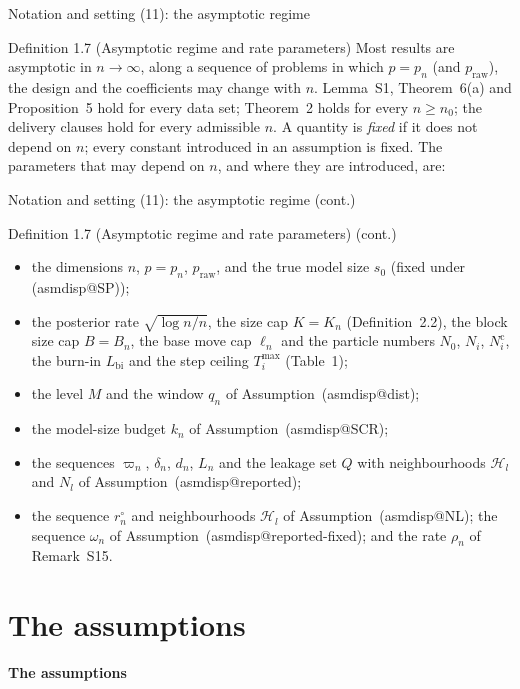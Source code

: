 \documentclass[aspectratio=169]{beamer}
\makeatletter
\newcommand{\asmdisp}[1]{\csname asmdisp@#1\endcsname}
\newcommand{\as}[1]{\textup{(\asmdisp{#1})}}
\newcommand{\praw}{p_{\mathrm{raw}}}
\newcommand{\sz}{s_0}
\newcommand{\rn}{\sqrt{\log n/n}}
\newcommand{\Hl}{\mathcal H}
\newcommand{\Nc}{N^{\mathrm c}}
\newcommand{\Lbi}{L_{\mathrm{bi}}}
\newcommand{\Tmax}{T^{\max}}
\makeatother
\begin{document}
\begin{frame}{Notation and setting (11): the asymptotic regime}
\footnotesize
\begin{block}{Definition 1.7 (Asymptotic regime and rate parameters)}
Most results are asymptotic in $n\to\infty$, along a sequence of problems in which $p=p_n$ (and $\praw$), the design and
the coefficients may change with $n$. Lemma~S1, Theorem~6(a) and Proposition~5 hold for every data
set; Theorem~2 holds for every $n\ge n_0$; the delivery clauses hold for every admissible $n$. A quantity is
\emph{fixed} if it does not depend on $n$; every constant introduced
in an assumption is fixed. The parameters that may depend on $n$, and where they are introduced, are:
\end{block}
\end{frame}

\begin{frame}{Notation and setting (11): the asymptotic regime (cont.)}
\footnotesize
\begin{block}{Definition 1.7 (Asymptotic regime and rate parameters) (cont.)}
\begin{itemize}
  \item the dimensions $n$, $p=p_n$, $\praw$, and the true model size $\sz$ (fixed under \as{SP});
  \item the posterior rate $\rn$, the size cap $K=K_n$ (Definition~2.2), the block size cap $B=B_n$, the
    base move cap $\ell_n$ and the particle numbers $N_0$, $N_i$, $\Nc_i$, the burn-in $\Lbi$ and the step ceiling
    $\Tmax_i$ (Table~1);
  \item the level $M$ and the window $q_n$ of Assumption~\as{dist};
  \item the model-size budget $k_n$ of Assumption~\as{SCR};
  \item the sequences $\varpi_n$, $\delta_n$, $d_n$, $L_n$ and the leakage set $Q$ with neighbourhoods $\Hl_l$ and
    $N_l$ of Assumption~\as{reported};
  \item the sequence $r^\circ_n$ and neighbourhoods $\Hl_l$ of Assumption~\as{NL}; the sequence $\omega_n$ of
    Assumption~\as{reported-fixed}; and the rate $\rho_n$ of Remark~S15.
\end{itemize}
\end{block}
\end{frame}

\section{The assumptions}
\begin{frame}
\centering\Large\textbf{The assumptions}
\end{frame}
\end{document}

